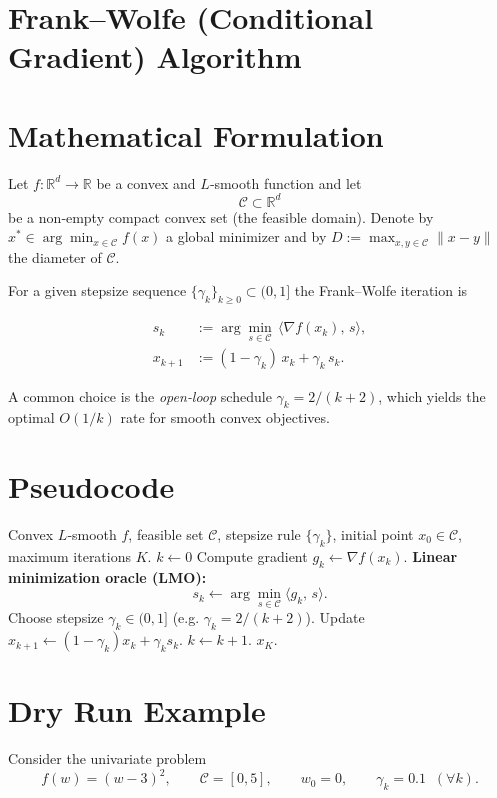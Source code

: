 \documentclass{article}
\newcommand{\R}{\mathbb{R}}
\begin{document}
\section*{Frank–Wolfe (Conditional Gradient) Algorithm}

\section*{Mathematical Formulation}
Let $f:\R^{d}\rightarrow\R$ be a convex and $L$‑smooth function and let 
\[
\mathcal C\subset\R^{d}
\]
be a non‑empty compact convex set (the feasible domain).  
Denote by $x^{*}\in\arg\min_{x\in\mathcal C}f(x)$ a global minimizer and by
$D:=\max_{x,y\in\mathcal C}\|x-y\|$ the diameter of $\mathcal C$.

For a given stepsize sequence $\{\gamma_{k}\}_{k\ge 0}\subset(0,1]$ the
Frank–Wolfe iteration is

\[
\boxed{
\begin{aligned}
s_{k}      &:= \arg\min_{s\in\mathcal C}\,\langle \nabla f(x_{k}),\,s\rangle,
\\[4pt]
x_{k+1}    &:= (1-\gamma_{k})\,x_{k}+\gamma_{k}\,s_{k}.
\end{aligned}}
\tag{FW}
\]

A common choice is the \emph{open‑loop} schedule $\gamma_{k}=2/(k+2)$,
which yields the optimal $O(1/k)$ rate for smooth convex objectives.

\section*{Pseudocode}
\begin{algorithm}[H]
\caption{Frank–Wolfe (Conditional Gradient)}\label{alg:FW}
\begin{algorithmic}[1]
\Require Convex $L$‑smooth $f$, feasible set $\mathcal C$, stepsize rule $\{\gamma_k\}$,
initial point $x_{0}\in\mathcal C$, maximum iterations $K$.
\State $k\gets 0$
    \State Compute gradient $g_{k}\gets \nabla f(x_{k})$.
    \State \textbf{Linear minimization oracle (LMO):}
          \[
          s_{k}\gets \arg\min_{s\in\mathcal C}\langle g_{k},\,s\rangle .
          \]
    \State Choose stepsize $\gamma_{k}\in(0,1]$ (e.g. $\gamma_{k}=2/(k+2)$).
    \State Update $x_{k+1}\gets (1-\gamma_{k})x_{k}+\gamma_{k}s_{k}$.
    \State $k\gets k+1$.
\EndWhile
\State \Return $x_{K}$.
\end{algorithmic}
\end{algorithm}

\section*{Dry Run Example}
Consider the univariate problem
\[
f(w)=(w-3)^{2},\qquad 
\mathcal C=[0,5],\qquad 
w_{0}=0,\qquad 
\gamma_{k}=0.1\;\;(\forall k).
\]
\end{document}

